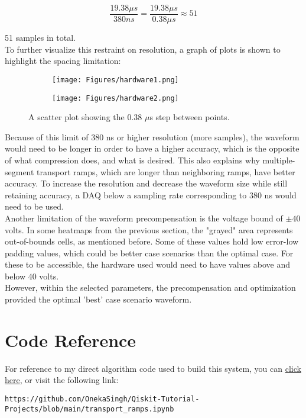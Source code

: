 \documentclass[11pt, a4paper]{article}
\theoremstyle{definition}
\numberwithin{equation}{section}
\begin{document}
\begin{equation}
    \dfrac{19.38 \mu s}{380 ns} = \dfrac{19.38 \mu s}{0.38 \mu s} \approx 51
\end{equation}

51 samples in total.
\\
To further visualize this restraint on resolution, a graph of plots is shown to highlight the spacing limitation:

\begin{figure}[hbt!]
\centering
\begin{subfigure}{0.5\linewidth}
  \centering
  \texttt{[image: Figures/hardware1.png]}
  \subcaption{}
  \label{hardware1}
\end{subfigure}
\quad
\begin{subfigure}{0.5\linewidth}
  \centering
  \texttt{[image: Figures/hardware2.png]}
  \caption{}
  \label{hardware2}
\end{subfigure}
\caption{A scatter plot showing the 0.38 $\mu$s step between points.}
\label{fig:3v1}
\end{figure}

Because of this limit of 380 ns or higher resolution (more samples), the waveform would need to be longer in order to have a higher accuracy, which is the opposite of what compression does, and what is desired. This also explains why multiple-segment transport ramps, which are longer than neighboring ramps, have better accuracy. To increase the resolution and decrease the waveform size while still retaining accuracy, a DAQ below a sampling rate corresponding to 380 ns would need to be used. 
\\
Another limitation of the waveform precompensation is the voltage bound of $\pm 40 $ volts. In some heatmaps from the previous section, the "grayed" area represents out-of-bounds cells, as mentioned before. Some of these values hold low error-low padding values, which could be better case scenarios than the optimal case. For these to be accessible, the hardware used would need to have values above and below 40 volts.
\\
However, within the selected parameters, the precompensation and optimization provided the optimal 'best' case scenario waveform.

\section{Code Reference}
For reference to my direct algorithm code used to build this system, you can \href{https://github.com/OnekaSingh/Qiskit-Tutorial-Projects/blob/main/transport_ramps.ipynb}{click here}, or visit the following link:
\begin{verbatim}
https://github.com/OnekaSingh/Qiskit-Tutorial-Projects/blob/main/transport_ramps.ipynb
\end{verbatim}
\end{document}
